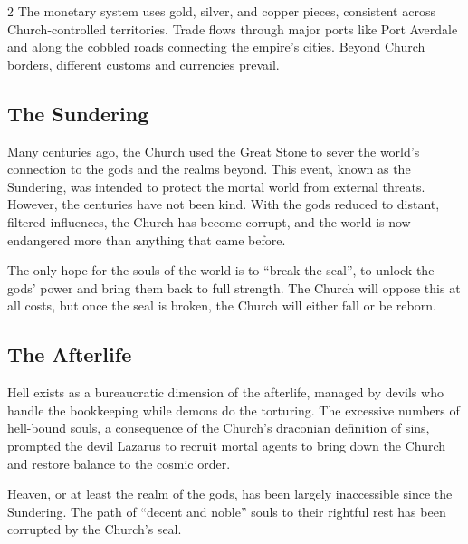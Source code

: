 \begin{multicols}{2}
The monetary system uses gold, silver, and copper pieces, consistent across Church-controlled territories.  Trade flows through major ports like Port Averdale and along the cobbled roads connecting the empire's cities.  Beyond Church borders, different customs and currencies prevail.

\subsection*{The Sundering}

Many centuries ago, the Church used the Great Stone to sever the world's connection to the gods and the realms beyond.  This event, known as the Sundering, was intended to protect the mortal world from external threats.  However, the centuries have not been kind.  With the gods reduced to distant, filtered influences, the Church has become corrupt, and the world is now endangered more than anything that came before.

The only hope for the souls of the world is to ``break the seal'', to unlock the gods' power and bring them back to full strength.  The Church will oppose this at all costs, but once the seal is broken, the Church will either fall or be reborn.

\subsection*{The Afterlife}

Hell exists as a bureaucratic dimension of the afterlife, managed by devils who handle the bookkeeping while demons do the torturing.  The excessive numbers of hell-bound souls, a consequence of the Church's draconian definition of sins, prompted the devil Lazarus to recruit mortal agents to bring down the Church and restore balance to the cosmic order.

Heaven, or at least the realm of the gods, has been largely inaccessible since the Sundering.  The path of ``decent and noble'' souls to their rightful rest has been corrupted by the Church's seal.

\end{multicols}

\twocolumn

\clearpage
